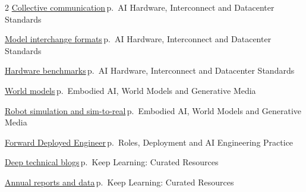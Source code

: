 \documentclass[10pt,a4paper,openany]{report}
\begin{document}
\begin{multicols}{2}
\hyperref[c:hardware-14]{Collective communication}\,{\color{muted}\scriptsize p.\,\pageref{c:hardware-14}} {\color{muted}\scriptsize AI Hardware, Interconnect and Datacenter Standards}\par\vspace{2pt}
\hyperref[c:hardware-15]{Model interchange formats}\,{\color{muted}\scriptsize p.\,\pageref{c:hardware-15}} {\color{muted}\scriptsize AI Hardware, Interconnect and Datacenter Standards}\par\vspace{2pt}
\hyperref[c:hardware-16]{Hardware benchmarks}\,{\color{muted}\scriptsize p.\,\pageref{c:hardware-16}} {\color{muted}\scriptsize AI Hardware, Interconnect and Datacenter Standards}\par\vspace{2pt}
\hyperref[c:embodied-2]{World models}\,{\color{muted}\scriptsize p.\,\pageref{c:embodied-2}} {\color{muted}\scriptsize Embodied AI, World Models and Generative Media}\par\vspace{2pt}
\hyperref[c:embodied-4]{Robot simulation and sim-to-real}\,{\color{muted}\scriptsize p.\,\pageref{c:embodied-4}} {\color{muted}\scriptsize Embodied AI, World Models and Generative Media}\par\vspace{2pt}
\hyperref[c:practice-0]{Forward Deployed Engineer}\,{\color{muted}\scriptsize p.\,\pageref{c:practice-0}} {\color{muted}\scriptsize Roles, Deployment and AI Engineering Practice}\par\vspace{2pt}
\hyperref[c:learn-0]{Deep technical blogs}\,{\color{muted}\scriptsize p.\,\pageref{c:learn-0}} {\color{muted}\scriptsize Keep Learning: Curated Resources}\par\vspace{2pt}
\hyperref[c:learn-2]{Annual reports and data}\,{\color{muted}\scriptsize p.\,\pageref{c:learn-2}} {\color{muted}\scriptsize Keep Learning: Curated Resources}\par\vspace{2pt}
\end{multicols}
\end{document}
